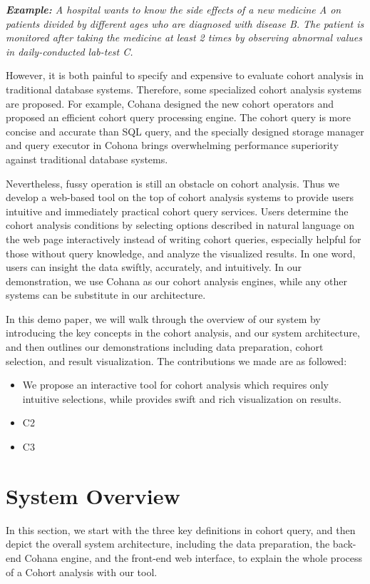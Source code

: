 \documentclass[10pt,conference,letterpaper]{IEEEtran}
\begin{document}
\emph{\textbf{Example:} A hospital wants to know the side effects of a new medicine A on patients divided by different ages who are diagnosed with disease B. The patient is monitored after taking the medicine at least 2 times by observing abnormal values in daily-conducted lab-test C.}

However, it is both painful to specify and expensive to evaluate cohort analysis in traditional database systems. Therefore, some specialized cohort analysis systems are proposed. For example, Cohana\cite{jiang2016cohort} designed the new cohort operators and proposed an efficient cohort query processing engine. The cohort query is more concise and accurate than SQL query, and the specially designed storage manager and query executor in Cohona brings overwhelming performance superiority against traditional database systems. 

Nevertheless, fussy operation is still an obstacle on cohort analysis. Thus we develop a web-based tool on the top of cohort analysis systems to provide users intuitive and immediately practical cohort query services. Users determine the cohort analysis conditions by selecting options described in natural language on the web page interactively instead of writing cohort queries, especially helpful for those without query knowledge, and analyze the visualized results. In one word, users can insight the data swiftly, accurately, and intuitively. In our demonstration, we use Cohana as our cohort analysis engines, while any other systems can be substitute in our architecture. 

In this demo paper, we will walk through the overview of our system by introducing the key concepts in the cohort analysis, and our system architecture, and then outlines our demonstrations including data preparation, cohort selection, and result visualization. The contributions we made are as followed:

\begin{itemize}
\item	We propose an interactive tool for cohort analysis which requires only intuitive selections, while provides swift and rich visualization on results.
\item   C2
\item   C3
\end{itemize}

\section{System Overview}
In this section, we start with the three key definitions in cohort query, and then depict the overall system architecture, including the data preparation, the back-end Cohana engine, and the front-end web interface, to explain the whole process of a Cohort analysis with our tool.  
\end{document}
